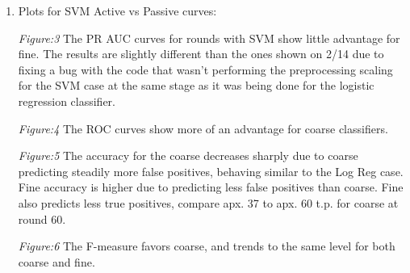 \documentclass[11pt]{article}   	%
\begin{document}
\begin{enumerate}[ label=\textbf{\Roman*.},listparindent=1.5em]
\item Plots for SVM Active vs Passive curves: \\%
\begin{center}	
\par \textit{Figure:3}   The PR AUC curves for rounds with SVM show little
advantage for fine. The results are slightly different than the ones shown
on 2/14 due to fixing a bug with the code that wasn't performing the
preprocessing scaling for the SVM case at the same stage as it was being
done for the logistic regression classifier.\\
\par \textit{Figure:4} The ROC curves show more of an advantage for coarse classifiers. \\
\par \textit{Figure:5}  The accuracy for the coarse decreases sharply due
to coarse predicting steadily more false positives, behaving similar to the
Log Reg case. Fine accuracy is higher due to predicting less false positives
than coarse. Fine also predicts less true positives, compare apx. 37 to apx.
60 t.p. for coarse at round 60. \\
\par \textit{Figure:6}  The F-measure favors coarse, and trends to the same level for both coarse and fine.\\
\end{center}

\break



\end{enumerate}
\end{document}
